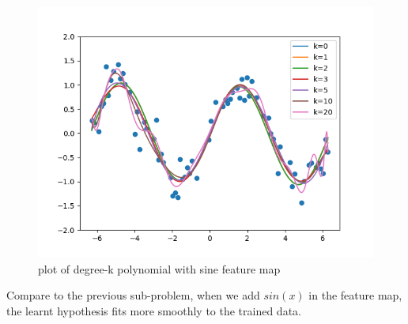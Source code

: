 \begin{answer}

    \begin{figure}[h]
        \centering
        \includegraphics[width=0.8\linewidth]{tex/featuremaps/plot_d.png}
        \caption{plot of degree-k polynomial with sine feature map}
        \label{fig:my_label}
    \end{figure}
    
    Compare to the previous sub-problem, when we add $sin(x)$ in the feature map, the learnt hypothesis fits more smoothly to the trained data. 

\end{answer}
